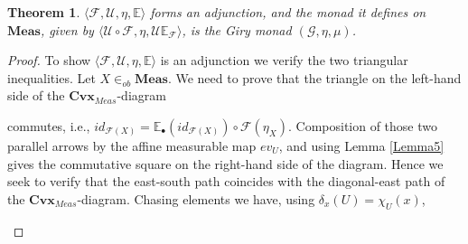\documentclass[11pt]{amsart}    %
\newtheorem{theorem}{Theorem}
\newcommand{\Rinf}{\mathbb{R}_{\infty}}
\newcommand{\G}{\mathcal{G}}
\begin{document}
\begin{theorem}  $\langle \mathcal{F}, \mathcal{U}, \eta, \mathbb{E} \rangle$ forms an adjunction, and  the  monad it defines on $\mathbf{Meas}$, given by $\langle \mathcal{U} \circ \mathcal{F}, \eta, \mathcal{U}\mathbb{E}_{\mathcal{F}} \rangle$,   is the Giry monad  $(\G, \eta, \mu)$.
\end{theorem}
\begin{proof}  To show  $\langle \mathcal{F}, \mathcal{U}, \eta, \mathbb{E} \rangle$ is an adjunction
we verify the two triangular inequalities.  Let $X \in_{ob} \mathbf{Meas}$.   We need to prove that the triangle on the left-hand side of the $\mathbf{Cvx}_{Meas}$-diagram
\begin{center}
\end{center}
commutes, i.e., $id_{\mathcal{F}(X)} = \mathbb{E}_{\bullet}(id_{\mathcal{F}(X)}) \circ \mathcal{F}(\eta_X)$.
Composition of those two parallel arrows by the affine measurable map $ev_U$, and using Lemma \ref{Lemma5} gives the commutative square on the right-hand side of the diagram.    Hence we seek to verify that the east-south path coincides with the diagonal-east path of the $\mathbf{Cvx}_{Meas}$-diagram.  Chasing elements we have, using $\delta_x(U)=\chi_U(x)$, 
\begin{center}
\end{center}
\end{proof}
\end{document}
